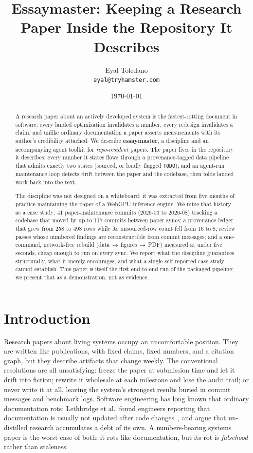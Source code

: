 \documentclass{article}
\title{Essaymaster: Keeping a Research Paper Inside the Repository It Describes}
\author{Eyal Toledano\\ \texttt{eyal@tryhamster.com}}
\date{\today}
\begin{document}
\maketitle

\begin{abstract}
A research paper about an actively developed system is the fastest-rotting document in
software: every landed optimization invalidates a number, every redesign invalidates a
claim, and unlike ordinary documentation a paper asserts measurements with its
author's credibility attached. We describe \textbf{essaymaster}, a discipline and an
accompanying agent toolkit for \emph{repo-resident} papers. The paper lives in the
repository it describes; every number it states flows through a provenance-tagged data
pipeline that admits exactly two states (sourced, or loudly flagged \texttt{TODO});
and an agent-run maintenance loop detects drift between the paper and the codebase,
then folds landed work back into the text.

The discipline was not designed on a whiteboard; it was extracted from five months of
practice maintaining the paper of a WebGPU inference engine. We mine that history as a
case study: 41 paper-maintenance commits (2026-03 to 2026-08) tracking a codebase that
moved by up to 117 commits between paper syncs; a provenance ledger that grew from 258
to 498 rows while its unsourced-row count fell from 16 to 8; review
passes whose numbered findings are reconstructible from commit messages; and a
one-command, network-free rebuild (data\,$\rightarrow$\,figures\,$\rightarrow$\,PDF)
measured at under five seconds, cheap enough to run on every sync. We report what the
discipline guarantees structurally, what it merely encourages, and what a single
self-reported case study cannot establish. This paper is itself the first end-to-end
run of the packaged pipeline; we present that as a demonstration, not as evidence.
\end{abstract}

\section{Introduction}
\label{sec:intro}

Research papers about living systems occupy an uncomfortable position. They are
written like publications, with fixed claims, fixed numbers, and a citation graph, but
they describe artifacts that change weekly. The conventional resolutions are all
unsatisfying: freeze the paper at submission time and let it drift into fiction;
rewrite it wholesale at each milestone and lose the audit trail; or never write it at
all, leaving the system's strongest results buried in commit messages and benchmark
logs. Software engineering has long known that ordinary documentation rots;
Lethbridge et al.\ found engineers reporting that documentation is usually not updated
after code changes~\citep{lethbridge2003documentation}, and \citet{olah2017research}
argue that un-distilled research accumulates a debt of its own. A numbers-bearing
systems paper is the worst case of both: it rots like documentation, but its rot is
\emph{falsehood} rather than staleness.
\end{document}
